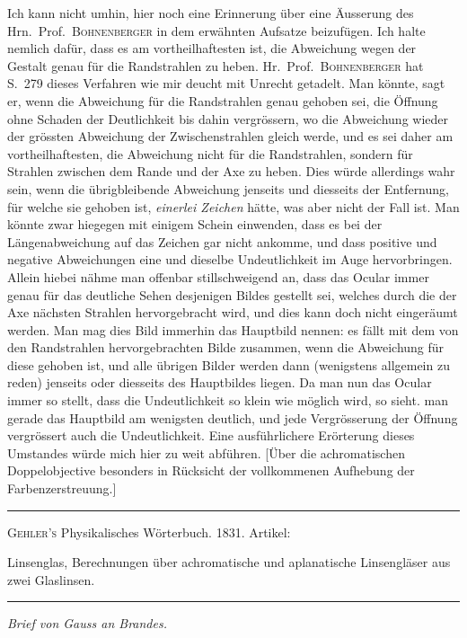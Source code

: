 Ich kann nicht umhin, hier noch eine Erinnerung über eine Äusserung des Hrn.\ Prof.\ \textsc{Bohnenberger} in dem erwähnten Aufsatze beizufügen. Ich halte nemlich dafür, dass es am vortheilhaftesten ist, die Abweichung wegen der Gestalt genau für die Randstrahlen zu heben. Hr.\ Prof.\ \textsc{Bohnenberger} hat S.\ 279 dieses Verfahren wie mir deucht mit Unrecht getadelt. Man könnte, sagt er, wenn die Abweichung für die Randstrahlen genau gehoben sei, die Öffnung ohne Schaden der Deutlichkeit bis dahin vergrössern, wo die Abweichung wieder der grössten Abweichung der Zwischenstrahlen gleich werde, und es sei daher am vortheilhaftesten, die Abweichung nicht für die Randstrahlen, sondern für Strahlen zwischen dem Rande und der Axe zu heben. Dies würde allerdings wahr sein, wenn die übrigbleibende Abweichung jenseits und diesseits der Entfernung, für welche sie gehoben ist, \textit{einerlei Zeichen} hätte, was aber nicht der Fall ist. Man könnte zwar hiegegen mit einigem Schein einwenden, dass es bei der Längenabweichung auf das Zeichen gar nicht ankomme, und dass positive und negative Abweichungen eine und dieselbe Undeutlichkeit im Auge hervorbringen. Allein hiebei nähme man offenbar stillschweigend an, dass das Ocular immer genau für das deutliche Sehen desjenigen Bildes gestellt sei, welches durch die der Axe nächsten Strahlen hervorgebracht wird, und dies kann doch nicht eingeräumt werden. Man mag dies Bild immerhin das Hauptbild nennen: es fällt mit dem von den Randstrahlen hervorgebrachten Bilde zusammen, wenn die Abweichung für diese gehoben ist, und alle übrigen Bilder werden dann (wenigstens allgemein zu reden) jenseits oder diesseits des Hauptbildes liegen. Da man nun das Ocular immer so stellt, dass die Undeutlichkeit so klein wie möglich wird, so sieht. man gerade das Hauptbild am wenigsten deutlich, und jede Vergrösserung der Öffnung vergrössert auch die Undeutlichkeit. Eine ausführlichere Erörterung dieses Umstandes würde mich hier zu weit abführen.
\clearpage
{}
\expandafter\def\csname HistoricalNoteText515\endcsname{[Über die achromatischen Doppelobjective besonders in Rücksicht der vollkommenen Aufhebung der Farbenzerstreuung.]}
\begin{center}
\hrule\vspace{2mm}
\textsc{Gehler's} Physikalisches Wörterbuch. 1831. Artikel:\par
Linsenglas, Berechnungen über achromatische und aplanatische Linsengläser aus zwei Glaslinsen.
\vspace{2mm}\hrule\vspace{5mm}
{\large\itshape Brief von Gauss an Brandes.\par}
\end{center}
